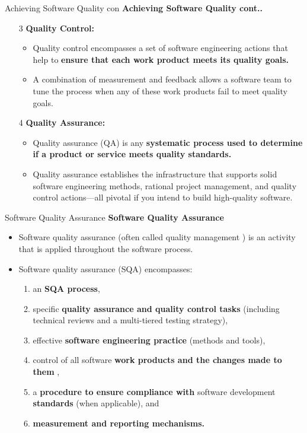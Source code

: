 \documentclass{beamer}
\begin{document}
\begin{frame}{Achieving Software Quality con}
	\textbf{Achieving Software Quality cont..}
	\begin{itemize}
		\item[3] \textbf{Quality Control: }
		\begin{itemize}
			\item Quality control encompasses a set of software engineering actions that help to\textbf{ ensure that each work product meets its quality goals.}
			\item A combination of measurement and feedback allows a software team to tune the process when any of these work products fail to meet quality goals.
		\end{itemize} 
		\item[4] \textbf{Quality Assurance: }
		\begin{itemize}
			\item Quality assurance (QA) is any \textbf{systematic process used to determine if a product or service meets quality standards.}
			\item Quality assurance establishes the infrastructure that supports solid software engineering methods, rational project management, and quality control actions—all pivotal if you intend to build high-quality software.
		\end{itemize}
	\end{itemize}
\end{frame}
\begin{frame}{Software Quality Assurance}
	\textbf{Software Quality Assurance}
	\begin{itemize}
		\item Software quality assurance (often called quality management ) is an activity that is applied throughout the software process.
		\item Software quality assurance (SQA) encompasses: 
		\begin{enumerate}
			\item an \textbf{SQA process}, 
			\item specific \textbf{quality assurance and quality control tasks} (including technical reviews and a multi-tiered testing strategy), 
			\item effective \textbf{software engineering practice} (methods and tools), 
			\item control of all software\textbf{ work products and the changes made to them }, 
			\item a \textbf{procedure to ensure compliance with} software development \textbf{standards} (when applicable), and 
			\item \textbf{measurement and reporting mechanisms.}
			
		\end{enumerate}
	\end{itemize}
\end{frame}
\end{document}
